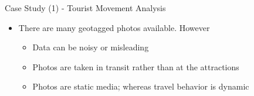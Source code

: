 \documentclass[
 size=14pt,
 paper=smartboard,  %
 mode=present, 		%
 display=slides, 	%
 style=tuliplab,  	%
 pauseslide,
 fleqn,leqno]{powerdot}{}
\begin{document}
\begin{slide}[toc=,bm=]{Case Study (1) - Tourist Movement Analysis}

\begin{itemize}
\item
There are many geotagged photos available.
However

\begin{itemize}
\item
Data can be noisy or misleading

\item
Photos are taken in transit rather than at the attractions

\item
Photos are static media; whereas travel behavior is dynamic
\end{itemize}
\end{itemize}



\end{slide}
\end{document}

